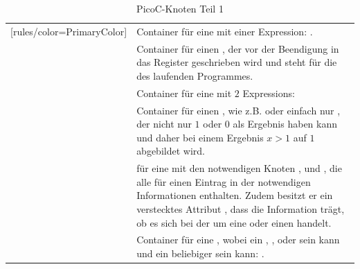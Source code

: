 \begin{table}[H]
\begin{NiceTabular}{X[7]X[10]}[rules/color=PrimaryColor]
   & Container für eine  mit einer Expression: . \\
   & Container für einen , der vor der Beendigung in das  Register geschrieben wird und steht für die  des laufenden Programmes. \\
   & Container für eine  mit $2$ Expressions: \\
   & Container für einen , wie z.B.  oder einfach nur , der nicht nur $1$ oder $0$ als Ergebnis haben kann und daher bei einem Ergebnis $x > 1$ auf $1$ abgebildet wird. \\
   &  für eine   mit den notwendigen Knoten ,   und  , die alle für einen Eintrag in der   notwendigen Informationen enthalten. Zudem besitzt er ein \textcolor{gray!90!black}{verstecktes Attribut}  , dass die Information trägt, ob es sich bei der  um eine  oder einen  handelt. \\
   & Container für eine , wobei  ein  , ,  oder   sein kann und   ein beliebiger  sein kann: . \\
  \bottomrule
\end{NiceTabular}
\caption{PicoC-Knoten Teil 1}
\label{tab:picoc_knoten_teil_1}
\end{table}

